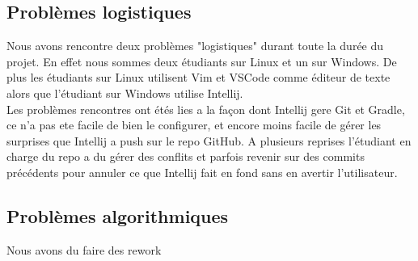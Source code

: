 \documentclass[../main.tex]{subfiles}
\begin{document}
\subsection{Problèmes logistiques}
Nous avons rencontre deux problèmes "logistiques" durant toute la durée du projet.
En effet nous sommes deux étudiants sur Linux et un sur Windows.
De plus les étudiants sur Linux utilisent Vim et VSCode comme éditeur de texte alors que l'étudiant sur Windows utilise Intellij.\\
Les problèmes rencontres ont étés lies a la façon dont Intellij gere Git et Gradle, ce n'a pas ete facile de bien le configurer, et encore moins facile de gérer les surprises que Intellij a push sur le repo GitHub.
A plusieurs reprises l'étudiant en charge du repo a du gérer des conflits et parfois revenir sur des commits précédents pour annuler ce que Intellij fait en fond sans en avertir l'utilisateur.\\

\subsection{Problèmes algorithmiques}
Nous avons du faire des rework 
\end{document}
